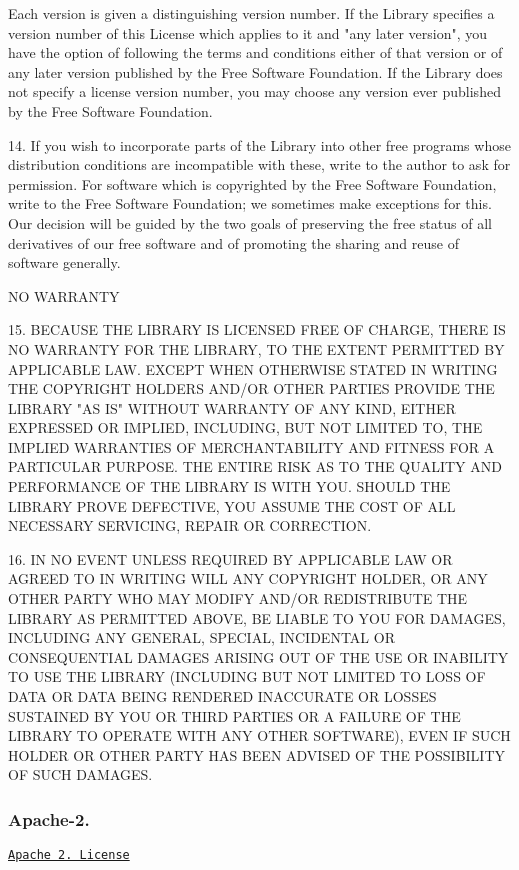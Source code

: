 \begin{DoxyVerb}
Each version is given a distinguishing version number. If the Library specifies a version number of
this License which applies to it and "any later version", you have the option of following the terms
and conditions either of that version or of any later version published by the Free Software
Foundation. If the Library does not specify a license version number, you may choose any version
ever published by the Free Software Foundation.

14. If you wish to incorporate parts of the Library into other free programs whose distribution
conditions are incompatible with these, write to the author to ask for permission. For software
which is copyrighted by the Free Software Foundation, write to the Free Software Foundation; we
sometimes make exceptions for this. Our decision will be guided by the two goals of preserving the
free status of all derivatives of our free software and of promoting the sharing and reuse of
software generally.

NO WARRANTY

15. BECAUSE THE LIBRARY IS LICENSED FREE OF CHARGE, THERE IS NO WARRANTY FOR THE LIBRARY, TO THE
EXTENT PERMITTED BY APPLICABLE LAW. EXCEPT WHEN OTHERWISE STATED IN WRITING THE COPYRIGHT HOLDERS
AND/OR OTHER PARTIES PROVIDE THE LIBRARY "AS IS" WITHOUT WARRANTY OF ANY KIND, EITHER EXPRESSED OR
IMPLIED, INCLUDING, BUT NOT LIMITED TO, THE IMPLIED WARRANTIES OF MERCHANTABILITY AND FITNESS FOR A
PARTICULAR PURPOSE. THE ENTIRE RISK AS TO THE QUALITY AND PERFORMANCE OF THE LIBRARY IS WITH YOU.
SHOULD THE LIBRARY PROVE DEFECTIVE, YOU ASSUME THE COST OF ALL NECESSARY SERVICING, REPAIR OR
CORRECTION.

16. IN NO EVENT UNLESS REQUIRED BY APPLICABLE LAW OR AGREED TO IN WRITING WILL ANY COPYRIGHT HOLDER,
OR ANY OTHER PARTY WHO MAY MODIFY AND/OR REDISTRIBUTE THE LIBRARY AS PERMITTED ABOVE, BE LIABLE TO
YOU FOR DAMAGES, INCLUDING ANY GENERAL, SPECIAL, INCIDENTAL OR CONSEQUENTIAL DAMAGES ARISING OUT OF
THE USE OR INABILITY TO USE THE LIBRARY (INCLUDING BUT NOT LIMITED TO LOSS OF DATA OR DATA BEING
RENDERED INACCURATE OR LOSSES SUSTAINED BY YOU OR THIRD PARTIES OR A FAILURE OF THE LIBRARY TO
OPERATE WITH ANY OTHER SOFTWARE), EVEN IF SUCH HOLDER OR OTHER PARTY HAS BEEN ADVISED OF THE
POSSIBILITY OF SUCH DAMAGES.
\end{DoxyVerb}
\hypertarget{aboutLicensesOSL_licenseOSApache20}{}\subsubsection{Apache-\/2.}\label{aboutLicensesOSL_licenseOSApache20}
\href{https://opensource.org/licenses/Apache-2.0}{\tt Apache 2. License}

